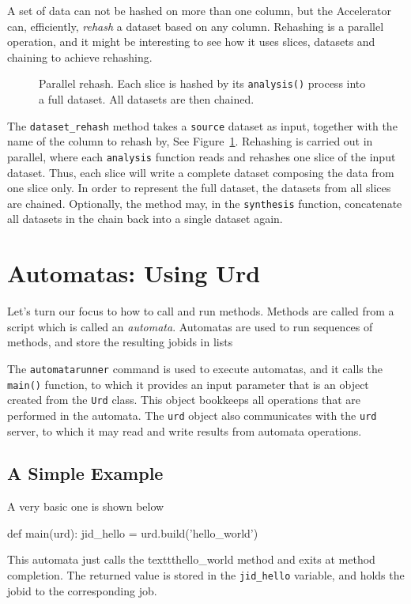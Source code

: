 \documentclass[a4paper]{article}
\begin{document}
A set of data can not be hashed on more than one column, but the
Accelerator can, efficiently, \textsl{rehash} a dataset based on any
column.  Rehashing is a parallel operation, and it might be
interesting to see how it uses slices, datasets and chaining to
achieve rehashing.

\begin{figure}[h!]
  \begin{center}
    
    \caption{Parallel rehash.  Each slice is hashed by its
      \texttt{analysis()} process into a full dataset.  All datasets
      are then chained.}
    \label{fig:rehash}
  \end{center}
\end{figure}

The \texttt{dataset\_rehash} method takes a \texttt{source} dataset as
input, together with the name of the column to rehash by, See
Figure~\ref{fig:rehash}.  Rehashing is carried out in parallel, where
each \texttt{analysis} function reads and rehashes one slice of the
input dataset.  Thus, each slice will write a complete dataset
composing the data from one slice only.  In order to represent the
full dataset, the datasets from all slices are chained.  Optionally,
the method may, in the \texttt{synthesis} function, concatenate all
datasets in the chain back into a single dataset again.

\clearpage





\section{Automatas:  Using Urd}
Let's turn our focus to how to call and run methods.  Methods are
called from a script which is called an \textsl{automata}.  Automatas
are used to run sequences of methods, and store the resulting jobids
in lists 



The \texttt{automatarunner} command is used to execute automatas, and
it calls the \texttt{main()} function, to which it provides an input
parameter that is an object created from the \texttt{Urd} class.  This
object bookkeeps all operations that are performed in the automata.
The \texttt{urd} object also communicates with the \texttt{urd}
server, to which it may read and write results from automata operations.

\subsection{A Simple Example}
A very basic one is shown below
\begin{python}
def main(urd):
  jid_hello = urd.build('hello_world')
\end{python}
This automata just calls the texttt{hello\_world} method and exits at
method completion.  The returned value is stored in the
\texttt{jid\_hello} variable, and holds the jobid to the corresponding
job.
\end{document}
